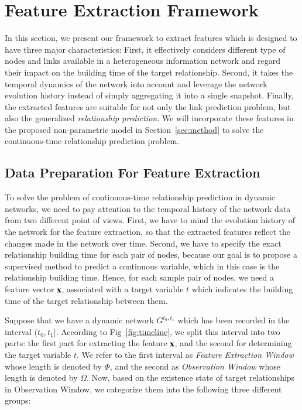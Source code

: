 \section{Feature Extraction Framework}\label{sec:features}

In this section, we present our framework to extract features which is designed to have three major characteristics: First, it effectively considers different type of nodes and links available in a heterogeneous information network and regard their impact on the building time of the target relationship. Second, it takes the temporal dynamics of the network into account and leverage the network evolution history instead of simply aggregating it into a single snapshot. Finally, the extracted features are suitable for not only the link prediction problem, but also the generalized \emph{relationship prediction}. We will incorporate these features in the proposed non-parametric model in Section~\ref{sec:method} to solve the continuous-time relationship prediction problem.

\subsection{Data Preparation For Feature Extraction}
To solve the problem of continuous-time relationship prediction in dynamic networks, we need to pay attention to the temporal history of the network data from two different point of views. First, we have to mind the evolution history of the network for the feature extraction, so that the extracted features reflect the changes made in the network over time. Second, we have to specify the exact relationship building time for each pair of nodes, because our goal is to propose a supervised method to predict a continuous variable, which in this case is the relationship building time. Hence, for each sample pair of nodes, we need a feature vector $\mathbf{x}$, associated with a target variable $t$ which indicates the building time of the target relationship between them.

Suppose that we have a dynamic network $G^{t_0,t_1}$ which has been recorded in the interval $(t_0, t_1]$. According to Fig~\ref{fig:timeline}, we split this interval into two parts: the first part for extracting the feature $\mathbf{x}$, and the second for determining the target variable $t$. We refer to the first interval as \emph{Feature Extraction Window} whose length is denoted by $\Phi$, and the second as \emph{Observation Window} whose length is denoted by $\Omega$. Now, based on the existence state of target relationships in Observation Window, we categorize them into the following three different groups:

